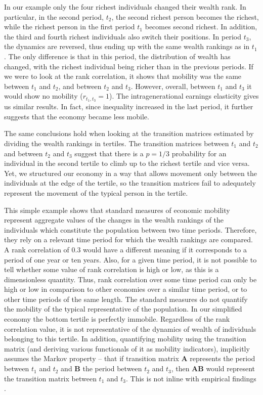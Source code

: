 \documentclass[11pt]{article}
\newcommand{\blue}[1]{{\color{blue} #1}}
\newcommand{\YB}[1]{\blue{{\it YB: #1 YB}}}
\numberwithin{equation}{section}
\begin{document}

In our example only the four richest individuals changed their wealth rank. In particular, in the second period, $t_2$, the second richest person becomes the richest, while the richest person in the first period $t_1$ becomes second richest. In addition, the third and fourth richest individuals also switch their positions. In period $t_3$, the dynamics are reversed, thus ending up with the same wealth rankings as in $t_1$. The only difference is that in this period, the distribution of wealth has changed, with the richest individual being richer than in the previous periods.
If we were to look at the rank correlation, it shows that mobility was the same between $t_1$ and $t_2$, and between $t_2$ and $t_3$. However, overall, between $t_1$ and $t_3$ it would show no mobility ($r_{t_1,t_3} = 1$). The intragenerational earnings elasticity gives us similar results. In fact, since inequality increased in the last period, it further suggests that the economy became less mobile. 

The same conclusions hold when looking at the transition matrices estimated by dividing the wealth rankings in tertiles. The transition matrices between $t_1$ and $t_2$ and between $t_2$ and $t_3$ suggest that there is a $p=1/3$ probability for an individual in the second tertile to climb up to the richest tertile and vice versa. Yet, we structured our economy in a way that allows movement only between the individuals at the edge of the tertile, so the transition matrices fail to adequately represent the movement of the typical person in the tertile.

This simple example shows that standard measures of economic mobility represent aggregate values of the changes in the wealth rankings of the individuals which constitute the population between two time periods. Therefore, they rely on a relevant time period for which the wealth rankings are compared. A rank correlation of 0.3 would have a different meaning if it corresponds to a period of one year or ten years. Also, for a given time period, it is not possible to tell whether some value of rank correlation is high or low, as this is a dimensionless quantity. Thus, rank correlation over some time period can only be high or low in comparison to other economies over a similar time period, or to other time periods of the same length.
The standard measures do not quantify the mobility of the typical representative of the population. In our simplified economy the bottom tertile is perfectly immobile. Regardless of the rank correlation value, it is not representative of the dynamics of wealth of individuals belonging to this tertile. In addition, quantifying mobility using the transition matrix (and deriving various functionals of it as mobility indicators), implicitly assumes the Markov property -- that if transition matrix $\mathbf{A}$ represents the period between $t_1$ and $t_2$ and $\mathbf{B}$ the period between $t_2$ and $t_3$, then $\mathbf{A B}$ would represent the transition matrix between $t_1$ and $t_3$. This is not inline with empirical findings \citep{Mcfarland1970,Clark2015}.
\FloatBarrier
\end{document}
